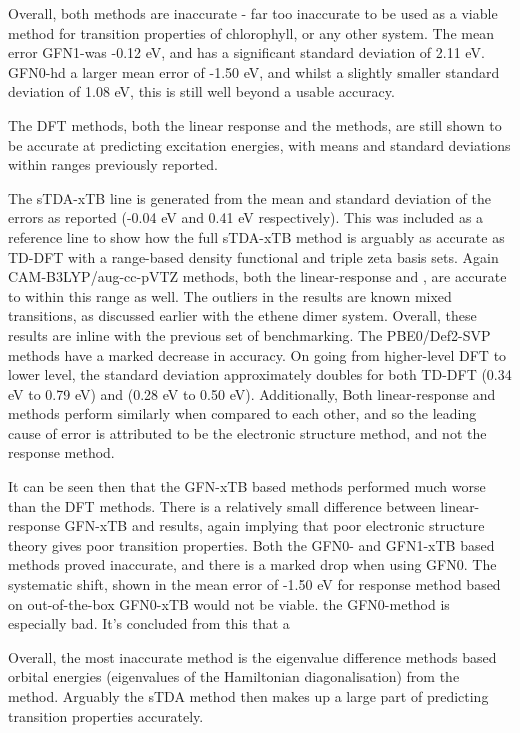 Overall, both \dxtb methods are inaccurate - far too inaccurate to be used as a 
viable method for transition properties of chlorophyll, or any other system.
The mean error GFN1-\dxtb was -0.12 eV, and has a significant standard deviation
of 2.11 eV. GFN0-\dxtb hd a larger mean error of -1.50 eV, and whilst a slightly
smaller standard deviation of 1.08 eV, this is still well beyond a usable accuracy.

The DFT methods, both the linear response and the \dscf methods, are still shown
to be accurate at predicting excitation energies, with means and standard deviations
within ranges previously reported.

The sTDA-xTB line is generated from the mean and standard deviation of the errors
as reported (-0.04 eV and 0.41 eV respectively)\cite{Grimme2016}. This was included
as a reference line to show how the full sTDA-xTB method is arguably as accurate 
as TD-DFT with a range-based density functional and triple zeta basis sets.
Again CAM-B3LYP/aug-cc-pVTZ methods, both the linear-response and \dscf, are 
accurate to within this range as well. The outliers in the \dscf results are known 
mixed transitions, as discussed earlier with the ethene dimer system. Overall, these
results are inline with the previous set of benchmarking. 
The PBE0/Def2-SVP methods have a marked decrease in accuracy. On going from higher-level
DFT to lower level, the standard deviation approximately doubles for both TD-DFT
(0.34 eV to 0.79 eV) and \dscf (0.28 eV to 0.50 eV). Additionally, Both
linear-response and \dscf methods perform similarly when compared to each other,
and so the leading cause of error is attributed to be the electronic structure 
method, and not the response method.

It can be seen then that the GFN-xTB based methods performed much worse than the
DFT methods. There is a relatively small difference between linear-response GFN-xTB
and \dxtb results, again implying that poor electronic structure theory gives
poor transition properties.
Both the GFN0- and GFN1-xTB based methods proved inaccurate, and there is a marked
drop when using GFN0. The systematic shift, shown in the mean error of -1.50 eV for
response method based on out-of-the-box GFN0-xTB would not be viable.
the GFN0-\dxtb method is especially bad. It's concluded from this that a

Overall, the most inaccurate method is the eigenvalue difference methods based
orbital energies (eigenvalues of the Hamiltonian diagonalisation) from the 
method. Arguably the sTDA method then makes up a large part of predicting transition 
properties accurately.


